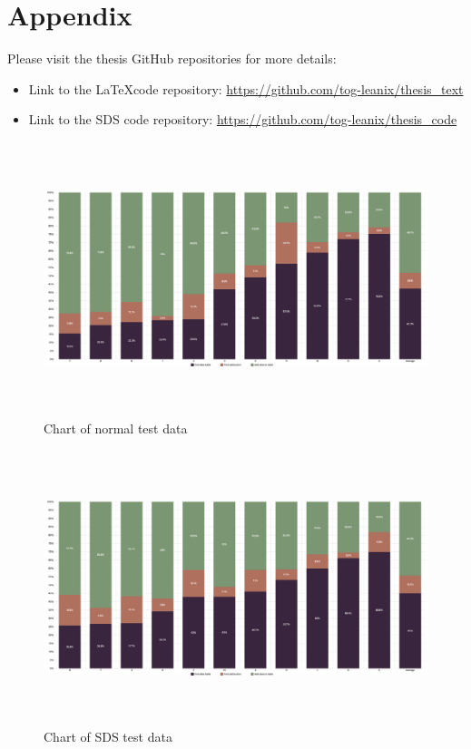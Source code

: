 \section*{Appendix}
Please visit the thesis GitHub repositories for more details: \\
\begin{itemize}
    \item Link to the \LaTeX code repository: \url{https://github.com/tog-leanix/thesis_text}
    \item Link to the \acl{SDS} code repository: \url{https://github.com/tog-leanix/thesis_code}
\end{itemize}



\begin{figure}
    \centerline{
    \includegraphics[height=8cm]{images/normal_test_data_chart.png}}
\caption{Chart of normal test data}
\end{figure}
\begin{figure}
    \centerline{
    \includegraphics[height=8cm]{images/sds_test_data_chart.png}}
\caption{Chart of \ac{SDS} test data}
\end{figure}
